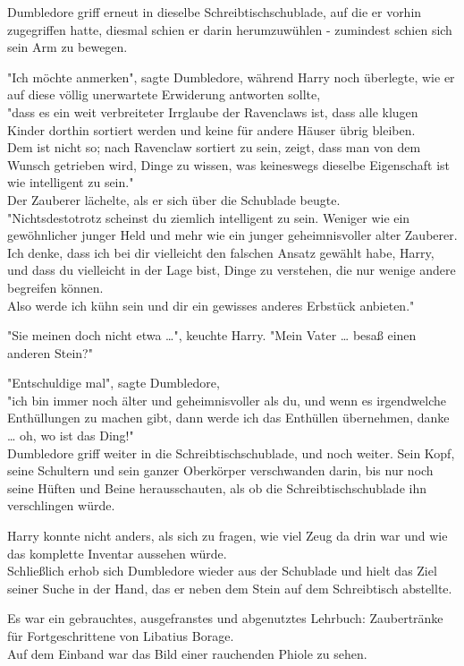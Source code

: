 {Dumbledore griff erneut in dieselbe Schreibtischschublade, auf die er vorhin zugegriffen hatte, diesmal schien er darin herumzuwühlen - zumindest schien sich sein Arm zu bewegen.

"Ich möchte anmerken", sagte Dumbledore, während Harry noch überlegte, wie er auf diese völlig unerwartete Erwiderung antworten sollte,\\ "dass es ein weit verbreiteter Irrglaube der Ravenclaws ist, dass alle klugen Kinder dorthin sortiert werden und keine für andere Häuser übrig bleiben.\\ Dem ist nicht so; nach Ravenclaw sortiert zu sein, zeigt, dass man von dem Wunsch getrieben wird, Dinge zu wissen, was keineswegs dieselbe Eigenschaft ist wie intelligent zu sein."\\ Der Zauberer lächelte, als er sich über die Schublade beugte.\\ "Nichtsdestotrotz scheinst du ziemlich intelligent zu sein. Weniger wie ein gewöhnlicher junger Held und mehr wie ein junger geheimnisvoller alter Zauberer.\\ Ich denke, dass ich bei dir vielleicht den falschen Ansatz gewählt habe, Harry, und dass du vielleicht in der Lage bist, Dinge zu verstehen, die nur wenige andere begreifen können.\\ Also werde ich kühn sein und dir ein gewisses anderes Erbstück anbieten."

"Sie meinen doch nicht etwa …", keuchte Harry. "Mein Vater … besaß einen anderen Stein?"

"Entschuldige mal", sagte Dumbledore,\\ "ich bin immer noch älter und geheimnisvoller als du, und wenn es irgendwelche Enthüllungen zu machen gibt, dann werde ich das Enthüllen übernehmen, danke … oh, wo ist das Ding!"\\ Dumbledore griff weiter in die Schreibtischschublade, und noch weiter. Sein Kopf, seine Schultern und sein ganzer Oberkörper verschwanden darin, bis nur noch seine Hüften und Beine herausschauten, als ob die Schreibtischschublade ihn verschlingen würde.

Harry konnte nicht anders, als sich zu fragen, wie viel Zeug da drin war und wie das komplette Inventar aussehen würde.\\ Schließlich erhob sich Dumbledore wieder aus der Schublade und hielt das Ziel seiner Suche in der Hand, das er neben dem Stein auf dem Schreibtisch abstellte.

Es war ein gebrauchtes, ausgefranstes und abgenutztes Lehrbuch: Zaubertränke für Fortgeschrittene von Libatius Borage.\\ Auf dem Einband war das Bild einer rauchenden Phiole zu sehen.

}
